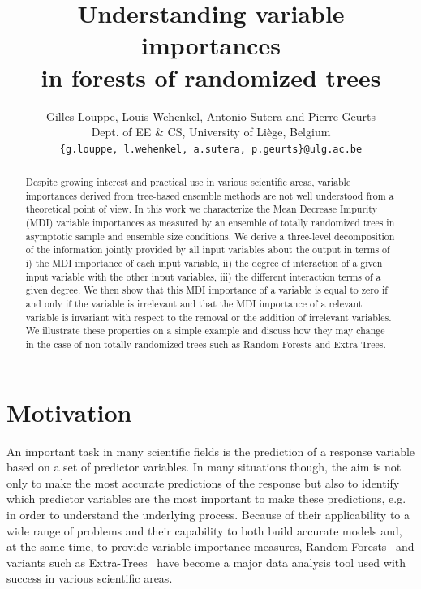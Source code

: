 \documentclass{article}
\title{\textbf{Understanding variable importances\\
in forests of randomized trees}}
\author{
Gilles Louppe, Louis Wehenkel, Antonio Sutera and Pierre Geurts\\
Dept. of EE \& CS, University of Liège, Belgium \\
\texttt{\{g.louppe, l.wehenkel, a.sutera, p.geurts\}@ulg.ac.be}\\
}
\begin{document}
\maketitle
\allowdisplaybreaks

\begin{abstract}

Despite growing interest and practical use in various scientific areas, variable
importances derived from tree-based ensemble methods are not well understood
from a theoretical point of view. In this work we characterize the Mean Decrease
Impurity (MDI) variable importances as measured by an ensemble of totally
randomized trees in asymptotic sample and ensemble size conditions. We derive a
three-level decomposition of the  information jointly provided by all input
variables about the output in terms of i) the MDI importance of each input
variable, ii) the degree of interaction of a given input variable with the other
input variables, iii) the different interaction terms of a given degree. We then
show that this MDI importance of a variable is equal to zero if and only if the
variable is irrelevant and that the MDI importance of a relevant variable is
invariant with respect to the removal or the addition of irrelevant variables.
We illustrate these properties on a simple example and discuss how they may
change in the case of  non-totally randomized trees such as Random Forests and
Extra-Trees.


\end{abstract}




\section{Motivation}

An important task in many scientific fields is the prediction of  a response
variable based on a set of predictor variables. In many situations though, the
aim is not only to make the most accurate predictions of the response but also
to identify which predictor variables are the most important to make these
predictions, e.g. in order to understand the underlying process. Because of
their applicability to a wide range of problems and their capability to both
build accurate models and, at the same time, to provide variable importance
measures, Random Forests~\citep{breiman2001rf} and variants such as Extra-Trees~\citep{geurts2006et}
have become a major data analysis tool used with
success in various scientific areas.
\end{document}
